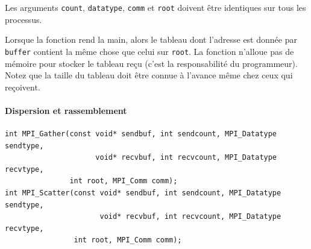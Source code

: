 Les arguments \verb|count|, \verb|datatype|, \verb|comm| et \verb|root| doivent
être identiques sur tous les processus.

Lorsque la fonction rend la main, alors le tableau dont l'adresse est
donnée par \verb|buffer| contient la même chose que celui sur
\verb|root|. La fonction n'alloue pas de mémoire pour stocker le
tableau reçu (c'est la responsabilité du programmeur). Notez que la
taille du tableau doit être connue à l'avance même chez ceux qui
reçoivent.

\begin{center}
\end{center}

\paragraph{Dispersion et rassemblement}

\begin{verbatim}
int MPI_Gather(const void* sendbuf, int sendcount, MPI_Datatype sendtype,
                     void* recvbuf, int recvcount, MPI_Datatype recvtype,
               int root, MPI_Comm comm);
int MPI_Scatter(const void* sendbuf, int sendcount, MPI_Datatype sendtype,
                      void* recvbuf, int recvcount, MPI_Datatype recvtype,
                int root, MPI_Comm comm);
\end{verbatim}

